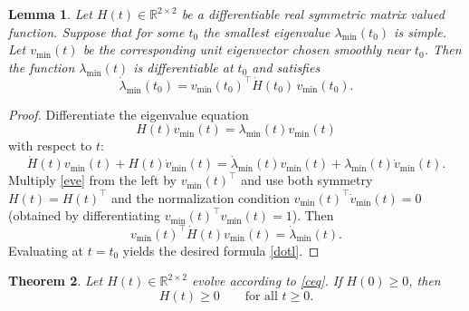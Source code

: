 \documentclass[reqno]{amsart}
\numberwithin{equation}{section}
\newtheorem{theorem}{Theorem}[section]
\newtheorem{lemma}[theorem]{Lemma}
\begin{document}
\begin{lemma} \label{lemma 1}  
Let $H(t)\in \mathbb{R}^{2\times 2}$ be a differentiable real symmetric matrix valued function. Suppose that for some $t_{0}$ the smallest eigenvalue 
$\lambda_{\min}(t_{0})$ is simple. Let $v_{\min}(t)$ be the corresponding 
unit eigenvector chosen smoothly near $t_{0}$. Then the function 
$\lambda_{\min}(t)$ is differentiable at $t_{0}$ and satisfies
\begin{equation}\label{dotl}
\dot{\lambda}_{\min}(t_{0})
=
v_{\min}(t_{0})^{\top}\dot{H}(t_{0})\, v_{\min}(t_{0}).
\end{equation}
\end{lemma}

\begin{proof}  Differentiate the eigenvalue equation
\[
H(t)v_{\min}(t)=\lambda_{\min}(t)v_{\min}(t)
\]
with respect to $t$:
\begin{equation}\label{eve}
\dot{H}(t)v_{\min}(t)
+H(t)\dot{v}_{\min}(t)
=
\dot{\lambda}_{\min}(t)v_{\min}(t)
+
\lambda_{\min}(t)\dot{v}_{\min}(t).
\end{equation}
Multiply \eqref{eve} from the left by $v_{\min}(t)^{\top}$ and use both symmetry 
$H(t)=H(t)^{\top}$ and the normalization condition 
$v_{\min}(t)^{\top}\dot{v}_{\min}(t)=0$ (obtained by differentiating 
$v_{\min}(t)^{\top}v_{\min}(t)=1$). Then
\[
v_{\min}(t)^{\top}\dot{H}(t)v_{\min}(t)
=
\dot{\lambda}_{\min}(t).
\]
Evaluating at $t=t_{0}$ yields the desired formula \eqref{dotl}.
\end{proof}


\begin{theorem}
Let $H(t)\in\mathbb{R}^{2\times 2}$ evolve according to \eqref{ceq}.  
If $H(0)\geq 0$, then
\[
H(t)\geq 0 \qquad \text{for all } t\ge 0.
\]
\end{theorem}
\end{document}
